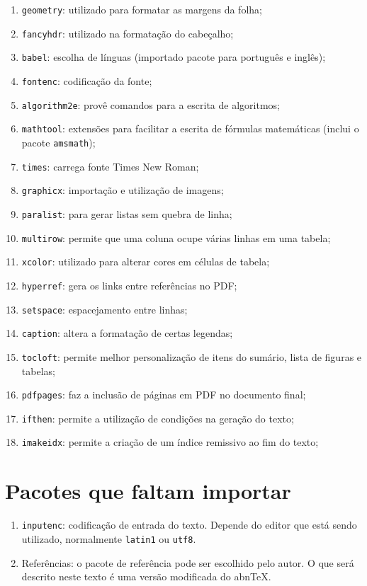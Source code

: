\documentclass{fei}
\begin{document}
    \begin{enumerate}
        \item\verb+geometry+: utilizado para formatar as margens da folha;
        \item\verb+fancyhdr+: utilizado na formatação do cabeçalho;
        \item\verb+babel+: escolha de línguas (importado pacote para português e inglês);
        \item\verb+fontenc+: codificação da fonte;
        \item\verb+algorithm2e+: provê comandos para a escrita de algoritmos;
        \item\verb+mathtool+: extensões para facilitar a escrita de fórmulas matemáticas (inclui o pacote \verb+amsmath+);
        \item\verb+times+: carrega fonte Times New Roman;
        \item\verb+graphicx+: importação e utilização de imagens;
        \item\verb+paralist+: para gerar listas sem quebra de linha;
        \item\verb+multirow+: permite que uma coluna ocupe várias linhas em uma tabela;
        \item\verb+xcolor+: utilizado para alterar cores em células de tabela;
        \item\verb+hyperref+: gera os links entre referências no PDF;
        \item\verb+setspace+: espacejamento entre linhas;
        \item\verb+caption+: altera a formatação de certas legendas;
        \item\verb+tocloft+: permite melhor personalização de itens do sumário, lista de figuras e tabelas;
        \item\verb+pdfpages+: faz a inclusão de páginas em PDF no documento final;
        \item\verb+ifthen+: permite a utilização de condições na geração do texto;
        \item\verb+imakeidx+: permite a criação de um índice remissivo ao fim do texto;
    \end{enumerate}

\section{Pacotes que faltam importar}

    \begin{enumerate}
        \item\verb+inputenc+: codificação de entrada do texto. Depende do editor que está sendo utilizado, normalmente \texttt{latin1} ou \texttt{utf8}.
        \item Referências: o pacote de referência pode ser escolhido pelo autor. O que será descrito neste texto é uma versão modificada do abn\TeX.
    \end{enumerate}
\end{document}
